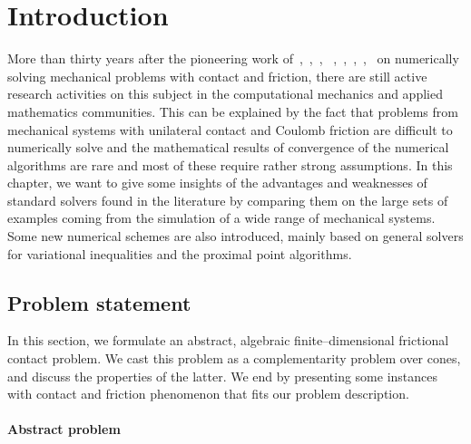 \newcommand{\tb}[1]{\textcolor{blue}{#1}}
\newcommand{\tg}[1]{#1}
\newcommand{\tgg}[1]{\textcolor{applegreen}{#1}}
\newcommand{\moh}[1]{\textcolor{applegreen}{#1}}
\newcommand{\MM}[0]{\rightrightarrows}









\section{Introduction}



More than thirty years after the pioneering work of~\cite{Panagiotopoulos_IA1975},~\cite{Necas.ea1980},~\cite{Haslinger1983,Haslinger1984,Haslinger.Panagiotopoulos_PRSE1984}, ~\cite{z-DelPieroMaceri_CISM1983,z-DelPieroMaceri_CISM1985},~\cite{Katona_IJNAMG1983},~\cite{Chaudhary.Bathe_CS1986},~\cite{Jean.Moreau1987},~\cite{Mitsopoulou.Doudoumis1988} on numerically solving mechanical problems with contact and friction, there are still active research activities on this subject in the computational mechanics and applied mathematics communities.  This can be explained by the fact that {problems from} mechanical systems with unilateral contact and Coulomb friction are difficult to numerically solve and the mathematical results of convergence of the numerical algorithms are rare and most of these require rather strong assumptions. In this chapter, we want to give some insights of the advantages and weaknesses of standard solvers found in the literature by comparing them on the large sets of examples coming from the simulation of a wide range of mechanical systems. Some new numerical schemes are also introduced, mainly based on general solvers for variational inequalities and the proximal point algorithms.

\subsection{Problem statement}
In this section, we formulate an abstract, algebraic finite--dimensional frictional contact problem. We cast this problem as a complementarity problem over cones, and discuss the properties of the latter.
We end by presenting some instances with contact and friction phenomenon that fits our problem description.

\paragraph{Abstract problem}

